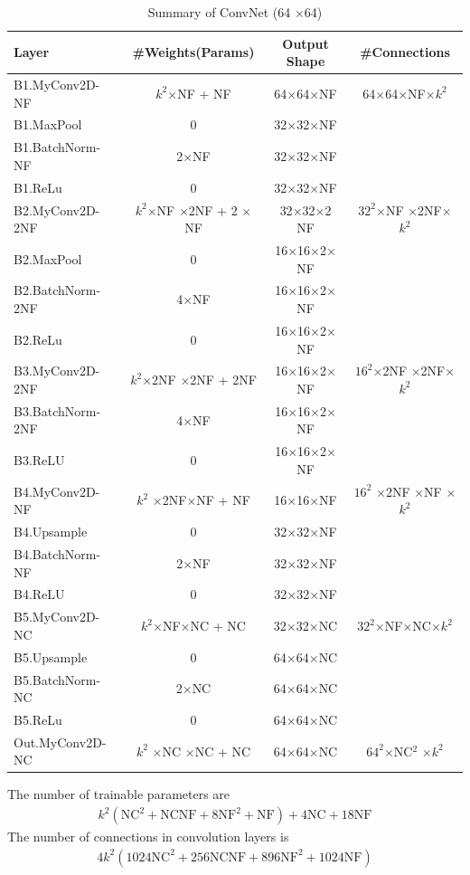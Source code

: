 \documentclass[12pt]{article}
\newcommand{\m}[0]{$\times$}
\begin{document}
	\begin{table}[H]
		\centering
		\small
		\caption{Summary of ConvNet (64 \m 64)}
		\begin{tabular}{l|c c c}
			\toprule
			Layer & \#Weights(Params) & Output Shape & \#Connections\\
			\midrule
			B1.MyConv2D-NF & $k^2$\m NF + NF & 64\m 64\m NF & 64\m 64\m NF\m $k^2$ \\
			B1.MaxPool & 0 & 32\m 32\m NF & \\
			B1.BatchNorm-NF & 2\m NF & 32\m 32\m NF & \\
			B1.ReLu & 0 & 32\m 32\m NF & \\
			\midrule
			B2.MyConv2D-2NF & $k^2$\m NF \m 2NF + 2 \m NF & 32\m 32\m 2 NF & $32^2$\m NF \m 2NF\m $k^2$ \\
			B2.MaxPool & 0 & 16\m 16\m 2\m NF & \\
			B2.BatchNorm-2NF & 4\m NF & 16\m 16\m 2\m NF & \\
			B2.ReLu & 0 & 16\m 16\m 2\m NF & \\
			\midrule
			B3.MyConv2D-2NF & $k^2$\m 2NF \m 2NF + 2NF & 16\m 16\m 2\m NF& $16^2$\m 2NF \m 2NF\m $k^2$ \\
			B3.BatchNorm-2NF & 4\m NF & 16\m 16\m 2\m NF & \\
			B3.ReLU & 0 & 16\m 16\m 2\m NF & \\
			\midrule
			B4.MyConv2D-NF & $k^2$ \m 2NF\m NF + NF & 16\m 16\m NF & $16^2$ \m 2NF \m NF \m $k^2$ \\
			B4.Upsample & 0 & 32\m 32\m NF & \\
			B4.BatchNorm-NF & 2\m NF & 32\m 32\m NF & \\
			B4.ReLU & 0 & 32\m 32\m NF & \\
			\midrule
			B5.MyConv2D-NC & $k^2$\m NF\m NC + NC& 32\m 32\m NC & $32^2$\m NF\m NC\m $k^2$ \\
			B5.Upsample & 0 & 64\m 64\m NC & \\
			B5.BatchNorm-NC & 2\m NC & 64\m 64\m NC & \\
			B5.ReLu & 0 & 64\m 64\m NC & \\
			\midrule
			Out.MyConv2D-NC & $k^2$ \m NC \m NC + NC& 64\m 64\m NC & $64^2$\m NC$^2$ \m $k^2$ \\
			\bottomrule
		\end{tabular}
	\end{table}
	The number of trainable parameters are 
	\begin{align}
		k^2 \left(\text{NC}^2+\text{NC} \text{NF}+8 \text{NF}^2+\text{NF}\right)+4 \text{NC}+18 \text{NF}
	\end{align}
	The number of connections in convolution layers is 
	\begin{align}
		4 k^2 \left(1024 \text{NC}^2+256 \text{NC} \text{NF}+896 \text{NF}^2+1024 \text{NF}\right)
	\end{align}
	
\end{document}
